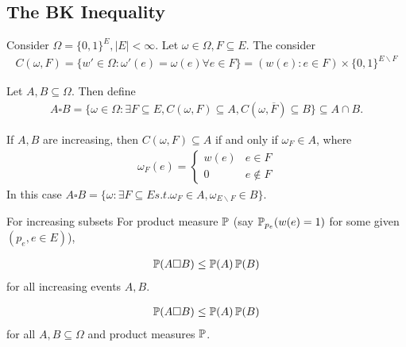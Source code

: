 \subsection{The BK Inequality}
\label{sec:bk-inequality}

Consider $\Omega = \{ 0, 1 \}^{E}, |E| < \infty$.  Let $\omega \in
\Omega, F \subseteq E$.  The consider
\begin{align}
  \label{eq:15}
  C(\omega, F) = \{ w' \in \Omega: \omega'(e) = \omega(e) \forall e
  \in F \} = (w(e): e \in F) \times \{ 0, 1 \}^{E \backslash F}
\end{align}

Let $A, B \subseteq \Omega$.  Then define
\begin{align}
  \label{eq:16}
  A \square B = \{ \omega \in \Omega: \exists F \subseteq E, C(\omega, F)
  \subseteq A, C(\omega, \overline F) \subseteq B \} \subseteq A \cap B.
\end{align}

If $A, B$ are increasing, then $C(\omega, F) \subseteq A$ if and only
if $\omega_{F} \in A$, where
\begin{align}
  \label{eq:17}
  \omega_{F}(e) =
  \begin{cases}
    w(e) & e \in F \\
    0 & e \notin F
  \end{cases}
\end{align}
In this case $A \square B = \{ \omega : \exists F \subseteq E s.t. \omega_{F}
\in A, \omega_{E \backslash F} \in B\}$.

\begin{thm}[BK inequality]
  \label{defn:random_walks_on_graphs:15}
  For increasing subsets For product measure $\Prob$ (say $\Prob{w(e)
    = 1}{p_{e}}$ for some given $(p_{e}, e \in E)$),

  \begin{align}
    \label{eq:18}
    \Prob{A \square B} \leq \Prob{A} \Prob{B}
  \end{align} for all increasing events $A, B$.
\end{thm}

\begin{thm}
  \label{defn:random_walks_on_graphs:16}
  \begin{align}
    \label{eq:19}
    \Prob{A \square B} \leq \Prob{A} \Prob{B}
  \end{align} for all $A, B \subseteq \Omega$ and product measures $\Prob$.
\end{thm}


